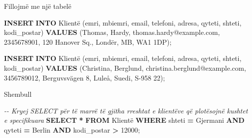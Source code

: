 \documentclass[
  ignorenonframetext,
]{beamer}
\newenvironment{Shaded}{\begin{snugshade}}{\end{snugshade}}
\newcommand{\CommentTok}[1]{\textcolor[rgb]{0.56,0.35,0.01}{\textit{#1}}}
\newcommand{\KeywordTok}[1]{\textcolor[rgb]{0.13,0.29,0.53}{\textbf{#1}}}
\newcommand{\NormalTok}[1]{#1}
\newcommand{\OperatorTok}[1]{\textcolor[rgb]{0.81,0.36,0.00}{\textbf{#1}}}
\newcommand{\StringTok}[1]{\textcolor[rgb]{0.31,0.60,0.02}{#1}}
\begin{document}
\begin{frame}[fragile]{Fillojmë me një tabelë}
\begin{Shaded}
\begin{Highlighting}[]
\KeywordTok{INSERT} \KeywordTok{INTO}\NormalTok{ Klientë (emri, mbiemri, email, telefoni, adresa, qyteti, shteti, kodi\_postar)}
\KeywordTok{VALUES}\NormalTok{ (}\StringTok{\textquotesingle{}Thomas\textquotesingle{}}\NormalTok{, }\StringTok{\textquotesingle{}Hardy\textquotesingle{}}\NormalTok{, }\StringTok{\textquotesingle{}thomas.hardy@example.com\textquotesingle{}}\NormalTok{, }\StringTok{\textquotesingle{}2345678901\textquotesingle{}}\NormalTok{, }\StringTok{\textquotesingle{}120 Hanover Sq.\textquotesingle{}}\NormalTok{, }\StringTok{\textquotesingle{}Londër\textquotesingle{}}\NormalTok{, }\StringTok{\textquotesingle{}MB\textquotesingle{}}\NormalTok{, }\StringTok{\textquotesingle{}WA1 1DP\textquotesingle{}}\NormalTok{);}

\KeywordTok{INSERT} \KeywordTok{INTO}\NormalTok{ Klientë (emri, mbiemri, email, telefoni, adresa, qyteti, shteti, kodi\_postar)}
\KeywordTok{VALUES}\NormalTok{ (}\StringTok{\textquotesingle{}Christina\textquotesingle{}}\NormalTok{, }\StringTok{\textquotesingle{}Berglund\textquotesingle{}}\NormalTok{, }\StringTok{\textquotesingle{}christina.berglund@example.com\textquotesingle{}}\NormalTok{, }\StringTok{\textquotesingle{}3456789012\textquotesingle{}}\NormalTok{, }\StringTok{\textquotesingle{}Berguvsvägen 8\textquotesingle{}}\NormalTok{, }\StringTok{\textquotesingle{}Luleå\textquotesingle{}}\NormalTok{, }\StringTok{\textquotesingle{}Suedi\textquotesingle{}}\NormalTok{, }\StringTok{\textquotesingle{}S{-}958 22\textquotesingle{}}\NormalTok{);}
\end{Highlighting}
\end{Shaded}
\end{frame}

\begin{frame}[fragile]{Shembull}
\label{shembull-24}

\begin{Shaded}
\begin{Highlighting}[]
\CommentTok{{-}{-} Kryej SELECT për të marrë të gjitha rreshtat e klientëve që plotësojnë kushtet e specifikuara}
\KeywordTok{SELECT} \OperatorTok{*} 
\KeywordTok{FROM}\NormalTok{ Klientë}
\KeywordTok{WHERE}\NormalTok{ shteti }\OperatorTok{=} \StringTok{\textquotesingle{}Gjermani\textquotesingle{}}
\KeywordTok{AND}\NormalTok{ qyteti }\OperatorTok{=} \StringTok{\textquotesingle{}Berlin\textquotesingle{}}
\KeywordTok{AND}\NormalTok{ kodi\_postar }\OperatorTok{\textgreater{}} \StringTok{\textquotesingle{}12000\textquotesingle{}}\NormalTok{;}
\end{Highlighting}
\end{Shaded}
\end{frame}
\end{document}
